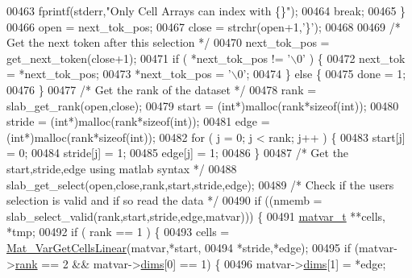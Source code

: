 \begin{DoxyCode}
{{{{{{{{{{{00463                 fprintf(stderr,\textcolor{stringliteral}{"Only Cell Arrays can index with \{\}"});
00464                 \textcolor{keywordflow}{break};
00465             \}
00466             open    = next\_tok\_pos;
00467             close   = strchr(open+1,\textcolor{charliteral}{'\}'});
00468 
00469             \textcolor{comment}{/* Get the next token after this selection */}
00470             next\_tok\_pos = get\_next\_token(close+1);
00471             \textcolor{keywordflow}{if} ( *next\_tok\_pos != \textcolor{charliteral}{'\(\backslash\)0'} ) \{
00472                 next\_tok = *next\_tok\_pos;
00473                 *next\_tok\_pos = \textcolor{charliteral}{'\(\backslash\)0'};
00474             \} \textcolor{keywordflow}{else} \{
00475                 done = 1;
00476             \}
00477             \textcolor{comment}{/* Get the rank of the dataset */}
00478             rank   = slab\_get\_rank(open,close);
00479             start  = (\textcolor{keywordtype}{int}*)malloc(rank*\textcolor{keyword}{sizeof}(\textcolor{keywordtype}{int}));
00480             stride = (\textcolor{keywordtype}{int}*)malloc(rank*\textcolor{keyword}{sizeof}(\textcolor{keywordtype}{int}));
00481             edge   = (\textcolor{keywordtype}{int}*)malloc(rank*\textcolor{keyword}{sizeof}(\textcolor{keywordtype}{int}));
00482             \textcolor{keywordflow}{for} ( j = 0; j < rank; j++ ) \{
00483                 start[j]  = 0;
00484                 stride[j] = 1;
00485                 edge[j]   = 1;
00486             \}
00487             \textcolor{comment}{/* Get the start,stride,edge using matlab syntax */}
00488             slab\_get\_select(open,close,rank,start,stride,edge);
00489             \textcolor{comment}{/* Check if the users selection is valid and if so read the data */}
00490             \textcolor{keywordflow}{if} ((nmemb = slab\_select\_valid(rank,start,stride,edge,matvar))) \{
00491                 \hyperlink{group___m_a_t_structmatvar__t}{matvar\_t} **cells, *tmp;
00492                 \textcolor{keywordflow}{if} ( rank == 1 ) \{
00493                     cells = \hyperlink{group___m_a_t_ga004987d665654409f74eaf8e82bb1380}{Mat\_VarGetCellsLinear}(matvar,*start,
00494                                   *stride,*edge);
00495                     \textcolor{keywordflow}{if} (matvar->\hyperlink{group___m_a_t_a84ba70c96ded13cc555fa75b768d9921}{rank} == 2 && matvar->\hyperlink{group___m_a_t_a8e01234e1c862ce3472bb37f5a09b92c}{dims}[0] == 1) \{
00496                         matvar->\hyperlink{group___m_a_t_a8e01234e1c862ce3472bb37f5a09b92c}{dims}[1] = *edge;
}}}}}}}}}}}
\end{DoxyCode}
